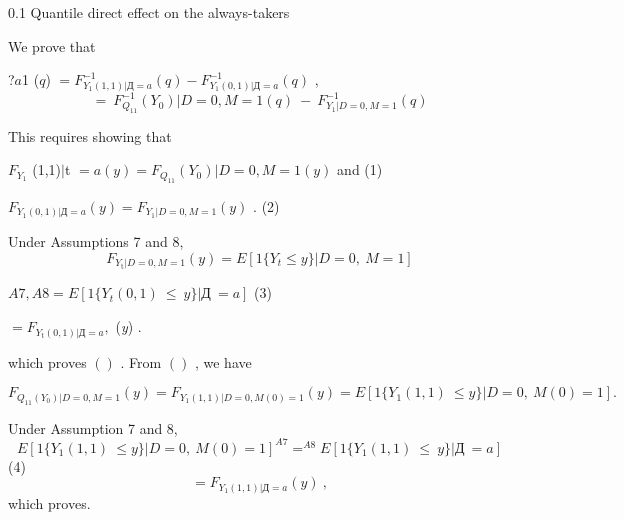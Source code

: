 \documentclass[a4paper,12pt]{article}
\begin{document}
0.1 Quantile direct effect on the always-takers

We prove that
\begin{center}
?$a$1 ($q$) $= F_{Y_{1}(1,1)|Д=a}^{-1}(q) - F_{Y_{1}(0,1)|Д=a}^{-1}(q)$ ,
$$
=\ F_{Q_{11}}^{-1}(Y_{0})|D=0,M=1(q)\ -\ F_{Y_{1}|D=0,M=1}^{-1}(q)
$$
\end{center}
This requires showing that
\begin{center}
$F_{Y_{1}}$ (1,1)$|$t $=a(y) = F_{Q_{11}}(Y_{0})|D=0,M=1(y)$ and   (1)

$F_{Y_{1}(0,1)|Д=a}(y)=F_{Y_{1}|D=0,M=1}(y)$ .   (2)
\end{center}
Under Assumptions 7 and 8,
$$
F_{Y_{\mathrm{t}}|D=0,M=1}(y)=E[1\{Y_{t}\leq y\}|D=0,\ M=1]
$$
\begin{center}
$A7,A8=E[1\{Y_{t}(0,1)\ \leq\ y\}|Д\ =a]$   (3)
\end{center}
$=F_{Y_{\mathrm{t}}(0,1)|Д=a},$ ({\it y}) .

which proves $()$ . From $()$ , we have

$F_{Q_{11}(Y_{0})|D=0,M=1}(y)=F_{Y_{1}(1,1)|D=0,M(0)=1}(y)=E[1\{Y_{1}(1,1)\ \leq y\}|D=0,\ M(0)=1].$

Under Assumption 7 and 8,
$$
E[1\{Y_{1}(1,1)\ \leq y\}|D=0,\ M(0)=1]^{A7}=^{A8}E[1\{Y_{1}(1,1)\ \leq\ y\}|Д\ =a]
$$
(4)
$$
=F_{Y_{1}(1,1)|Д=a}(y)\ ,
$$
which proves.
\end{document}
